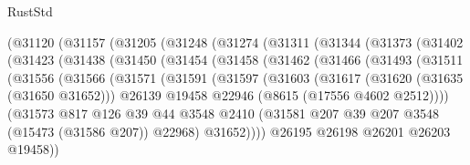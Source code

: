 \begin{lexlean}{RustStd}
\begin{coremodule}
        (@31120
          (@31157
            (@31205
              (@31248
                (@31274
                  (@31311
                    (@31344
                      (@31373
                        (@31402
                          (@31423
                            (@31438
                              (@31450
                                (@31454
                                  (@31458
                                    (@31462
                                      (@31466
                                        (@31493
                                          (@31511
                                            (@31556
                                              (@31566
                                                (@31571
                                                  (@31591
                                                    (@31597
                                                      (@31603
                                                        (@31617
                                                          (@31620 (@31635 (@31650 @31652)))
                                                          @26139
                                                          @19458
                                                          @22946
                                                          (@8615 (@17556 @4602 @2512))))
                                                      (@31573
                                                        @817
                                                        @126
                                                        @39
                                                        @44
                                                        @3548
                                                        @2410
                                                        (@31581
                                                          @207
                                                          @39
                                                          @207
                                                          @3548
                                                          (@15473 (@31586 @207))
                                                          @22968)
                                                        @31652))))
                                                @26195
                                                @26198
                                                @26201
                                                @26203
                                                @19458))

\end{coremodule}
\end{lexlean}
